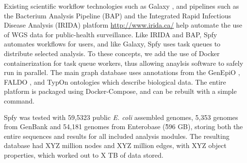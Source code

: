 Existing scientific workflow technologies such as Galaxy \citep{goecks2010galaxy}, and pipelines such as the Bacterium Analysis Pipeline (BAP) \citep{thomsen2016bacterial} and the Integrated Rapid Infectious Disease Analysis (IRIDA) platform \url{http://www.irida.ca/} help automate the use of WGS data for public-health surveillance.
Like IRIDA and BAP, Spfy automates workflows for users, and like Galaxy, Spfy uses task queues to distribute selected analysis. To these concepts, we add the use of Docker containerization for task queue workers, thus allowing anaylsis software to safely run in parallel. The main graph database uses annotations from the GenEpiO \citep{griffiths2017context}, FALDO \citep{bolleman2016faldo}, and TypOn \citep{vaz2014typon} ontologies which describe biological data. The entire platform is packaged using Docker-Compose, and can be rebuilt with a simple command.

Spfy was tested with 59,5323 public \textit{E. coli} assembled genomes, 5,353 genomes from GenBank and 54,181 genomes from Enterobase (\~596 GB), storing both the entire sequences and results for all included analysis modules.
The resulting database had XYZ million nodes and XYZ million edges, with XYZ object properties, which worked out to X TB of data stored.



